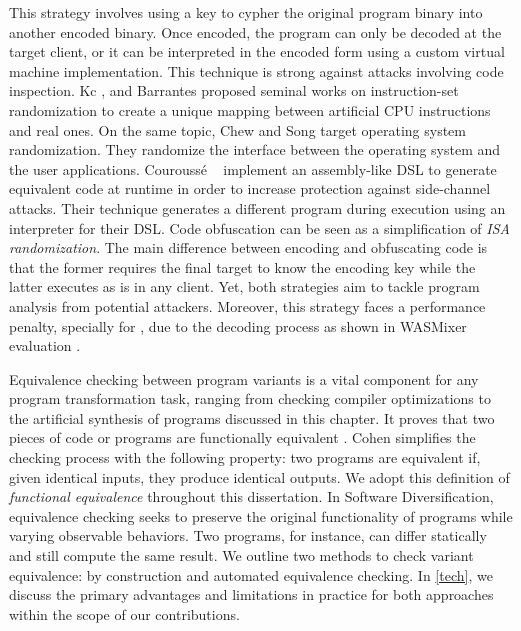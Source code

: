This strategy involves using a key to cypher the original program binary into another encoded binary. 
Once encoded, the program can only be decoded at the target client, or it can be interpreted in the encoded form using a custom virtual machine implementation. 
This technique is strong against attacks involving code inspection. 
Kc \etal \cite{Kc03}, and Barrantes \etal \cite{barrantes2003randomized} proposed seminal works on instruction-set randomization 
to create a unique mapping between artificial CPU instructions and real ones.
On the same topic, Chew and Song \cite{Chew02mitigatingbuffer} target operating system randomization. They randomize the interface between the operating system and the user applications.
Courouss{\'e} \etal~\cite{courousse2016runtime} implement an assembly-like DSL to generate equivalent code at runtime in order to increase protection against side-channel attacks. Their technique generates a different program during execution using an interpreter for their DSL.
Code obfuscation \cite{wobfuscator} can be seen as a simplification of \emph{ISA randomization}. 
The main difference between encoding and obfuscating code is that the former requires the final target to know the encoding key while the latter executes as is in any client. 
Yet, both strategies aim to tackle program analysis from potential attackers. 
Moreover, this strategy faces a performance penalty, specially for \Wasm, due to the decoding process as shown in WASMixer evaluation \cite{wasmixer}.


Equivalence checking between program variants is a vital component for any program transformation task, ranging from checking compiler optimizations \cite{LeCompilers} to the artificial synthesis of programs discussed in this chapter. 
It proves that two pieces of code or programs are functionally equivalent \cite{churchill2019}. 
Cohen \cite{cohen1993operating} simplifies the checking process with the following property: two programs are equivalent if, given identical inputs, they produce identical outputs. 
We adopt this definition of \emph{functional equivalence} throughout this dissertation. 
In Software Diversification, equivalence checking seeks to preserve the original functionality of programs while varying observable behaviors. 
Two programs, for instance, can differ statically and still compute the same result. 
We outline two methods to check variant equivalence: by construction and automated equivalence checking.
In \autoref{tech}, we discuss the primary advantages and limitations in practice for both approaches within the scope of our contributions.

